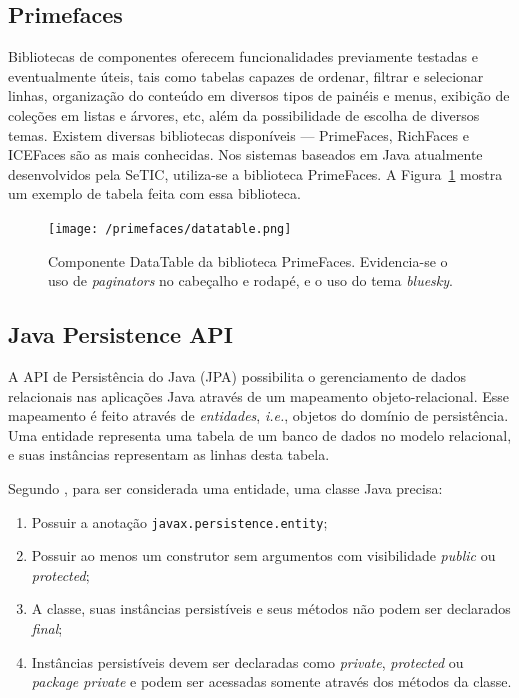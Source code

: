 \documentclass[
  10.5pt,				  %
	openright,			%
	twoside,			  %
  a5paper,
  chapter=TITLE,	%
	section=TITLE,	%
  hyphens,        %
	english,        %
	brazil          %
]{abntex2}
\begin{document}
\subsection{Primefaces}\label{sec:primefaces}
Bibliotecas de componentes oferecem funcionalidades previamente  testadas e eventualmente úteis, tais como tabelas capazes de ordenar, filtrar e selecionar linhas, organização do conteúdo em diversos tipos de painéis e menus, exibição de coleções em listas e árvores, etc, além da possibilidade de escolha de diversos temas. Existem diversas bibliotecas disponíveis --- PrimeFaces, RichFaces e ICEFaces são as mais conhecidas. Nos sistemas baseados em Java atualmente desenvolvidos pela SeTIC, utiliza-se a biblioteca PrimeFaces. A Figura~\ref{fig:primefaces_datatable} mostra um exemplo de tabela feita com essa biblioteca.

\begin{figure}[!ht]
  \caption{\label{fig:primefaces_datatable}Componente DataTable da biblioteca PrimeFaces. Evidencia-se o uso de \emph{paginators} no cabeçalho e rodapé, e o uso do tema \emph{bluesky}.}
  \begin{center}
    \texttt{[image: /primefaces/datatable.png]}
  \end{center}
\end{figure}

\subsection{Java Persistence API}\label{sec:jpa}

A API de Persistência do Java (JPA) possibilita o gerenciamento de dados relacionais nas aplicações Java através de um mapeamento objeto-relacional. Esse mapeamento é feito através de \emph{entidades}, \emph{i.e.}, objetos do domínio de persistência. Uma entidade representa uma tabela de um banco de dados no modelo relacional, e suas instâncias representam as linhas desta tabela. 

Segundo , para ser considerada uma entidade, uma classe Java precisa:

\begin{enumerate}
  \item Possuir a anotação \texttt{javax.persistence.entity};
  \item Possuir ao menos um construtor sem argumentos com visibilidade \emph{public} ou \emph{protected};
  \item A classe, suas instâncias persistíveis e seus métodos não podem ser declarados \emph{final};
  \item Instâncias persistíveis devem ser declaradas como \emph{private}, \emph{protected} ou \emph{package private} e podem ser acessadas somente através dos métodos da classe.
\end{enumerate}
\end{document}

